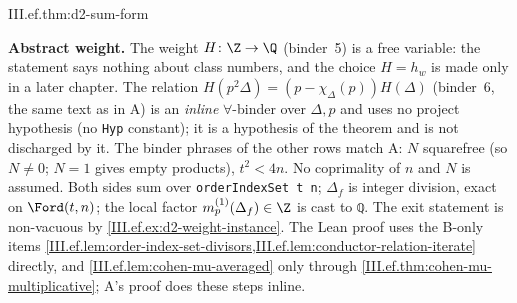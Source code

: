 \begin{theorem}
\end{theorem}
\begin{tfformal}{III.ef.thm:d2-sum-form}
\begin{tffidelity}
\textbf{Abstract weight.} The weight $H\colon\Z\to\Q$ (binder~5) is a free variable: the statement says nothing about class numbers, and the choice $H=h_w$ is made only in a later chapter. The relation $H(p^2\Delta)=(p-\chi_\Delta(p))H(\Delta)$ (binder~6, the same text as in A) is an \emph{inline} $\forall$-binder over $\Delta,p$ and uses no project hypothesis (no \texttt{Hyp} constant); it is a hypothesis of the theorem and is not discharged by it. The binder phrases of the other rows match A: $N$ squarefree (so $N\ne0$; $N=1$ gives empty products), $t^2<4n$. No coprimality of $n$ and $N$ is assumed. Both sides sum over \texttt{orderIndexSet t n}; $\Delta_f$ is integer division, exact on $\Ford(t,n)$; the local factor $m^{(1)}_p(\Delta_f)\in\Z$ is cast to \texttt{ℚ}. The exit statement is non-vacuous by \cref{III.ef.ex:d2-weight-instance}. The Lean proof uses the B-only items \cref{III.ef.lem:order-index-set-divisors,III.ef.lem:conductor-relation-iterate} directly, and \cref{III.ef.lem:cohen-mu-averaged} only through \cref{III.ef.thm:cohen-mu-multiplicative}; A's proof does these steps inline.
\end{tffidelity}
\end{tfformal}
